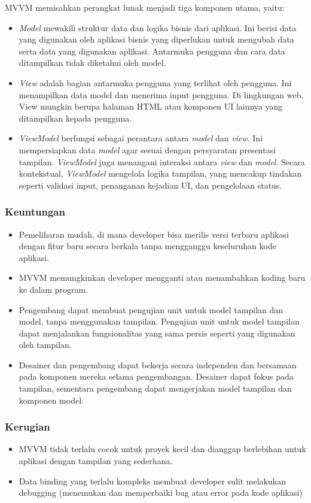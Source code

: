 \documentclass[conference]{IEEEtran}
\begin{document}
	MVVM memisahkan perangkat lunak menjadi tiga komponen utama, yaitu:
	\begin{itemize}
		\item \textit{Model} mewakili struktur data dan logika bisnis dari aplikasi. Ini berisi data yang digunakan oleh aplikasi bisnis yang diperlukan untuk mengubah data serta data yang digunakan aplikasi. Antarmuka pengguna dan cara data ditampilkan tidak diketahui oleh model.
		\item \textit{View} adalah bagian antarmuka pengguna yang terlihat oleh pengguna. Ini menampilkan data model dan menerima input pengguna. Di lingkungan web, View mungkin berupa halaman HTML atau komponen UI lainnya yang ditampilkan kepada pengguna.
		\item \textit{ViewModel} berfungsi sebagai perantara antara \textit{model} dan \textit{view}. Ini mempersiapkan data \textit{model} agar sesuai dengan persyaratan presentasi tampilan. \textit{ViewModel} juga menangani interaksi antara \textit{view} dan \textit{model}. Secara kontekstual, \textit{ViewModel} mengelola logika tampilan, yang mencakup tindakan seperti validasi input, penanganan kejadian UI, dan pengelolaan status.
	\end{itemize}
	
	\subsubsection{Keuntungan}
	\begin{itemize}
		\item Pemeliharan mudah, di mana developer bisa merilis versi terbaru aplikasi dengan fitur baru secara berkala tanpa mengganggu keseluruhan kode aplikasi. 
		\item MVVM memungkinkan developer mengganti atau menambahkan koding baru ke dalam program.
		\item Pengembang dapat membuat pengujian unit untuk model tampilan dan model, tanpa menggunakan tampilan. Pengujian unit untuk model tampilan dapat menjalankan fungsionalitas yang sama persis seperti yang digunakan oleh tampilan. 
		\item Desainer dan pengembang dapat bekerja secara independen dan bersamaan pada komponen mereka selama pengembangan. Desainer dapat fokus pada tampilan, sementara pengembang dapat mengerjakan model tampilan dan komponen model. 
	\end{itemize}
	
	\subsubsection{Kerugian}
	\begin{itemize}
		\item MVVM tidak terlalu cocok untuk proyek kecil dan dianggap berlebihan untuk aplikasi dengan tampilan yang sederhana. 
		\item Data binding yang terlalu kompleks membuat developer sulit melakukan debugging (menemukan dan memperbaiki bug atau error pada kode aplikasi) 
	\end{itemize}
	
\end{document}
